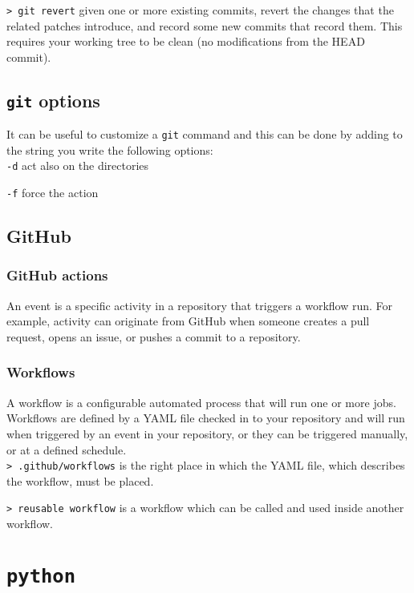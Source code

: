 \documentclass[11pt]{article}
\newcommand{\cmd}[1]{\colorbox{light-gray}{\textcolor{gio}{\texttt{#1}}}}
\begin{document}
\begin{multicols}{2}
\cmd{> git revert} given one or more existing commits, revert the changes that 
the related patches introduce, and record some new commits that record them. 
This requires your working tree to be clean (no modifications from the HEAD commit).

\subsection{\texttt{git} options}

It can be useful to customize a \texttt{git} command and this can be done by adding 
to the string you write the following options: \\

\cmd{-d} act also on the directories

\cmd{-f} force the action

\subsection{GitHub}

\subsubsection{GitHub actions}

An event is a specific activity in a repository that triggers a workflow run. 
For example, activity can originate from GitHub when someone creates a pull request, 
opens an issue, or pushes a commit to a repository.

\subsubsection{Workflows}

A workflow is a configurable automated process that will run one or more jobs. 
Workflows are defined by a YAML file checked in to your repository and will run 
when triggered by an event in your repository, or they can be triggered manually, 
or at a defined schedule. \\

\cmd{> .github/workflows} is the right place in which the YAML file, which 
describes the workflow, must be placed.

\cmd{> reusable workflow} is a workflow which can be called and used inside 
another workflow.

\section{\texttt{python}}


\end{multicols}
\end{document}
